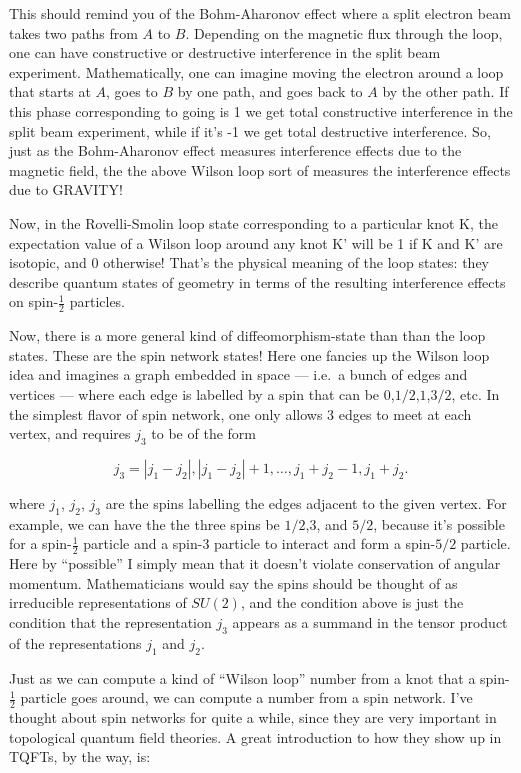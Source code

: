 \documentclass{article}
\begin{document}
This should remind you of the Bohm-Aharonov effect where a split
electron beam takes two paths from \(A\) to \(B\). Depending on the
magnetic flux through the loop, one can have constructive or destructive
interference in the split beam experiment. Mathematically, one can
imagine moving the electron around a loop that starts at \(A\), goes to
\(B\) by one path, and goes back to \(A\) by the other path. If this
phase corresponding to going is 1 we get total constructive interference
in the split beam experiment, while if it's -1 we get total destructive
interference. So, just as the Bohm-Aharonov effect measures interference
effects due to the magnetic field, the the above Wilson loop sort of
measures the interference effects due to GRAVITY!

Now, in the Rovelli-Smolin loop state corresponding to a particular knot
K, the expectation value of a Wilson loop around any knot K' will be 1
if K and K' are isotopic, and 0 otherwise! That's the physical meaning
of the loop states: they describe quantum states of geometry in terms of
the resulting interference effects on spin-\(\frac12\) particles.

Now, there is a more general kind of diffeomorphism-state than than the
loop states. These are the spin network states! Here one fancies up the
Wilson loop idea and imagines a graph embedded in space --- i.e.~a bunch
of edges and vertices --- where each edge is labelled by a spin that can
be \(0\),\(1/2\),\(1\),\(3/2\), etc. In the simplest flavor of spin
network, one only allows 3 edges to meet at each vertex, and requires
\(j_3\) to be of the form

\[j_3 = |j_1-j_2|, |j_1-j_2| + 1, \ldots, j_1+j_2-1, j_1+j_2.\]

where \(j_1\), \(j_2\), \(j_3\) are the spins labelling the edges
adjacent to the given vertex. For example, we can have the the three
spins be \(1/2\),\(3\), and \(5/2\), because it's possible for a
spin-\(\frac12\) particle and a spin-3 particle to interact and form a
spin-\(5/2\) particle. Here by ``possible'' I simply mean that it
doesn't violate conservation of angular momentum. Mathematicians would
say the spins should be thought of as irreducible representations of
\(SU(2)\), and the condition above is just the condition that the
representation \(j_3\) appears as a summand in the tensor product of the
representations \(j_1\) and \(j_2\).

Just as we can compute a kind of ``Wilson loop'' number from a knot that
a spin-\(\frac12\) particle goes around, we can compute a number from a
spin network. I've thought about spin networks for quite a while, since
they are very important in topological quantum field theories. A great
introduction to how they show up in TQFTs, by the way, is:
\end{document}
